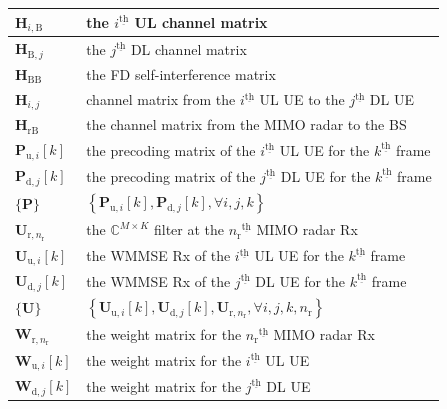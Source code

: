 \documentclass[10pt,journal]{IEEEtran}
\newcommand{\bracket}[1]{{\left [{#1}\right ]}}
\newcommand{\braces}[1]{{\left\{ {#1}\right\}}}
\newcommand{\ith}[1]    {{#1}^{\underline{\text{th}}}}
\newcommand{\rr}{_\mathrm{r}}
\newcommand{\rnr}{_{\mathrm{r},n_\mathrm{r}}}
\newcommand{\MM}{\mathit{M}}
\newcommand{\PiB}{\mathbf{P}_{\textrm{u},i}\bracket{k}}
\newcommand{\PBj}{\mathbf{P}_{\textrm{d},j}\bracket{k}}
\newcommand{\UiB}{\mathbf{U}_{\textrm{u},i}\bracket{k}}
\newcommand{\WiB}{\mathbf{W}_{\textrm{u},i}\bracket{k}}
\newcommand{\UBj}{\mathbf{U}_{\textrm{d},j}\bracket{k}}
\newcommand{\WBj}{\mathbf{W}_{\mathrm{d},j}\bracket{k}}
\newcommand{\Wrnr}{\mathbf{W}_{\mathrm{r},n_\mathrm{r}}}
\newcommand{\HrB}{\mathbf{H}_{\textrm{rB}}}
\newcommand{\HBj}{\mathbf{H}_{\textrm{B},j}}
\newcommand{\HBB}{\mathbf{H}_{\mathrm{BB}}}
\newcommand{\HiB}{\mathbf{H}_{i,\textrm{B}}}
\newcommand{\Hij}{\mathbf{H}_{i,j}}
\theoremstyle{definition}
\begin{document}
\begin{table}[!t]
\begin{tabular}{l||p{66mm}}
			\hline
			$\HiB$& the $\ith{i}$ UL channel matrix\\
			\hline
			$\HBj$& the $\ith{j}$ DL channel matrix\\
			\hline
			$\HBB$& the FD self-interference matrix\\
			\hline
			$\Hij$& channel matrix from the $\ith{i}$ UL UE to the $\ith{j}$ DL UE\\
			\hline
			$\HrB$& the channel matrix from the MIMO radar to the BS\\
			\hline
			$\PiB$& the precoding matrix of the $\ith{i}$ UL UE for the $\ith{k}$ frame\\
			\hline
			$\PBj$& the precoding matrix of the $\ith{j}$ DL UE for the $\ith{k}$ frame\\
			\hline
			$\{\mathbf{P}\}$& $\braces{\PiB,\PBj,\forall i,j,k}$\\
			\hline
			$\mathbf{U}_{\mathrm{r},n\rr}$& the $\mathbb{C}^{\MM\times\mathrm{\mathit{K}}}$ filter at the $\ith{n\rr}$ MIMO radar Rx\\
			\hline
			$\UiB$& the WMMSE Rx of the $\ith{i}$ UL UE for the $\ith{k}$ frame\\
			\hline
			$\UBj$& the WMMSE Rx of the $\ith{j}$ DL UE for the $\ith{k}$ frame\\
			\hline
			$\{\mathbf{U}\}$& $\braces{\UiB, \UBj, \mathbf{U}\rnr, \forall i,j,k,n\rr}$\\
			\hline
			$\Wrnr$& the weight matrix for the $\ith{n\rr}$ MIMO radar Rx\\
			\hline
			$\WiB$& the weight matrix for the $\ith{i}$ UL UE\\
			\hline
			$\WBj$& the weight matrix for the $\ith{j}$ DL UE\\
			\hline
		\end{tabular}
	\end{table}
\color{black}
\end{document}
